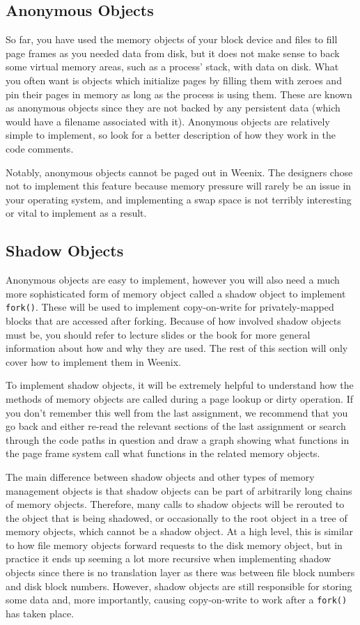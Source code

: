\subsection{Anonymous Objects} \label{anon}

So far, you have used the memory objects of your block device and files to fill page frames as you needed data from disk, but it does not make sense to back some virtual memory areas, such as a process' stack, with data on disk. What you often want is objects which initialize pages by filling them with zeroes and pin their pages in memory as long as the process is using them. These are known as anonymous objects since they are not backed by any persistent data (which would have a filename associated with it). Anonymous objects are relatively simple to implement, so look for a better description of how they work in the code comments.

Notably, anonymous objects cannot be paged out in Weenix. The designers chose not to implement this feature because memory pressure will rarely be an issue in your operating system, and implementing a swap space is not terribly interesting or vital to implement as a result.

\subsection{Shadow Objects}

Anonymous objects are easy to implement, however you will also need a much more sophisticated form of memory object called a shadow object to implement \texttt{fork()}. These will be used to implement copy-on-write for privately-mapped blocks that are accessed after forking. Because of how involved shadow objects must be, you should refer to lecture slides or the book for more general information about how and why they are used. The rest of this section will only cover how to implement them in Weenix.

To implement shadow objects, it will be extremely helpful to understand how the methods of memory objects are called during a page lookup or dirty operation. If you don't remember this well from the last assignment, we recommend that you go back and either re-read the relevant sections of the last assignment or search through the code paths in question and draw a graph showing what functions in the page frame system call what functions in the related memory objects.

The main difference between shadow objects and other types of memory management objects is that shadow objects can be part of arbitrarily long chains of memory objects. Therefore, many calls to shadow objects will be rerouted to the object that is being shadowed, or occasionally to the root object in a tree of memory objects, which cannot be a shadow object. At a high level, this is similar to how file memory objects forward requests to the disk memory object, but in practice it ends up seeming a lot more recursive when implementing shadow objects since there is no translation layer as there was between file block numbers and disk block numbers. However, shadow objects are still responsible for storing some data and, more importantly, causing copy-on-write to work after a \texttt{fork()} has taken place.

